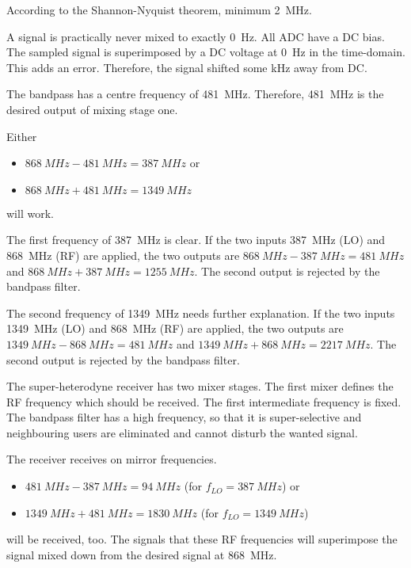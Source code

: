 \begin{solution}
	\begin{tasks}
		\task
		According to the Shannon-Nyquist theorem, minimum \SI{2}{MHz}.
		
		\begin{remark}
			A signal is practically never mixed to exactly \SI{0}{Hz}. All ADC have a DC bias. The sampled signal is superimposed by a DC voltage at \SI{0}{Hz} in the time-domain. This adds an error. Therefore, the signal shifted some \si{kHz} away from DC.
		\end{remark}
		
		\task
		The bandpass has a centre frequency of \SI{481}{MHz}. Therefore, \SI{481}{MHz} is the desired output of mixing stage one.
		
		
		Either
		\begin{itemize}
			\item $\SI{868}{MHz} - \SI{481}{MHz} = \SI{387}{MHz}$ or
			\item $\SI{868}{MHz} + \SI{481}{MHz} = \SI{1349}{MHz}$
		\end{itemize}
		will work.
		
		The first frequency of \SI{387}{MHz} is clear. If the two inputs \SI{387}{MHz} (LO) and \SI{868}{MHz} (RF) are applied, the two outputs are $\SI{868}{MHz} - \SI{387}{MHz} = \SI{481}{MHz}$ and $\SI{868}{MHz} + \SI{387}{MHz} = \SI{1255}{MHz}$. The second output is rejected by the bandpass filter.
		
		The second frequency of \SI{1349}{MHz} needs further explanation. If the two inputs \SI{1349}{MHz} (LO) and \SI{868}{MHz} (RF) are applied, the two outputs are $\SI{1349}{MHz} - \SI{868}{MHz} = \SI{481}{MHz}$ and $\SI{1349}{MHz} + \SI{868}{MHz} = \SI{2217}{MHz}$. The second output is rejected by the bandpass filter.
		
		\begin{remark}
			The super-heterodyne receiver has two mixer stages. The first mixer defines the RF frequency which should be received. The first intermediate frequency is fixed. The bandpass filter has a high frequency, so that it is super-selective and neighbouring users are eliminated and cannot disturb the wanted signal.
		\end{remark}
		
		\task
		The receiver receives on mirror frequencies.
		\begin{itemize}
			\item $\SI{481}{MHz} - \SI{387}{MHz} = \SI{94}{MHz}$ (for $f_{LO} = \SI{387}{MHz}$) or
			\item $\SI{1349}{MHz} + \SI{481}{MHz} = \SI{1830}{MHz}$ (for $f_{LO} = \SI{1349}{MHz}$)
		\end{itemize}
		will be received, too. The signals that these RF frequencies will superimpose the signal mixed down from the desired signal at \SI{868}{MHz}.
		

\end{tasks}
\end{solution}
